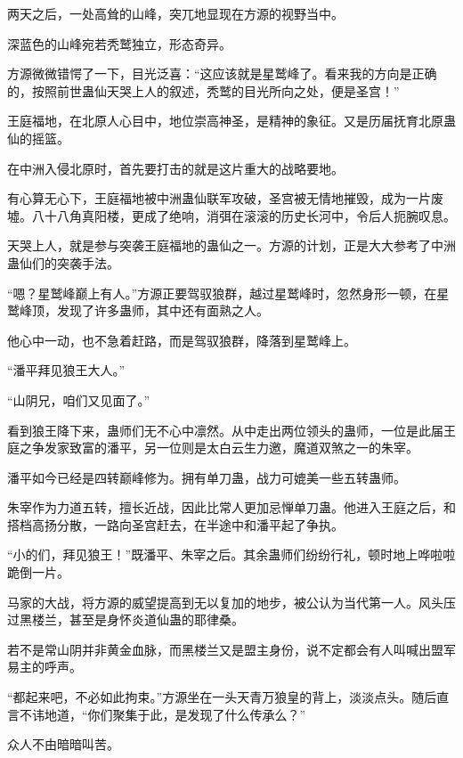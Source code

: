 
\begin{this_body}



两天之后，一处高耸的山峰，突兀地显现在方源的视野当中。

深蓝色的山峰宛若秃鹫独立，形态奇异。

方源微微错愕了一下，目光泛喜：“这应该就是星鹫峰了。看来我的方向是正确的，按照前世蛊仙天哭上人的叙述，秃鹫的目光所向之处，便是圣宫！”

王庭福地，在北原人心目中，地位崇高神圣，是精神的象征。又是历届抚育北原蛊仙的摇篮。

在中洲入侵北原时，首先要打击的就是这片重大的战略要地。

有心算无心下，王庭福地被中洲蛊仙联军攻破，圣宫被无情地摧毁，成为一片废墟。八十八角真阳楼，更成了绝响，消弭在滚滚的历史长河中，令后人扼腕叹息。

天哭上人，就是参与突袭王庭福地的蛊仙之一。方源的计划，正是大大参考了中洲蛊仙们的突袭手法。

“嗯？星鹫峰巅上有人。”方源正要驾驭狼群，越过星鹫峰时，忽然身形一顿，在星鹫峰顶，发现了许多蛊师，其中还有面熟之人。

他心中一动，也不急着赶路，而是驾驭狼群，降落到星鹫峰上。

“潘平拜见狼王大人。”

“山阴兄，咱们又见面了。”

看到狼王降下来，蛊师们无不心中凛然。从中走出两位领头的蛊师，一位是此届王庭之争发家致富的潘平，另一位则是太白云生力邀，魔道双煞之一的朱宰。

潘平如今已经是四转巅峰修为。拥有单刀蛊，战力可媲美一些五转蛊师。

朱宰作为力道五转，擅长近战，因此比常人更加忌惮单刀蛊。他进入王庭之后，和搭档高扬分散，一路向圣宫赶去，在半途中和潘平起了争执。

“小的们，拜见狼王！”既潘平、朱宰之后。其余蛊师们纷纷行礼，顿时地上哗啦啦跪倒一片。

马家的大战，将方源的威望提高到无以复加的地步，被公认为当代第一人。风头压过黑楼兰，甚至是身怀炎道仙蛊的耶律桑。

若不是常山阴并非黄金血脉，而黑楼兰又是盟主身份，说不定都会有人叫喊出盟军易主的呼声。

“都起来吧，不必如此拘束。”方源坐在一头天青万狼皇的背上，淡淡点头。随后直言不讳地道，“你们聚集于此，是发现了什么传承么？”

众人不由暗暗叫苦。


\end{this_body}
